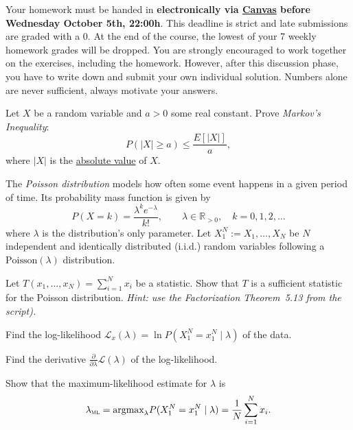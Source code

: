 \documentclass[a4paper,10pt,landscape,twocolumn]{scrartcl}
\newcommand\deadline{Wednesday October 5th, 22:00h}
\begin{document}
\homeworkproblems

{\sffamily\noindent
Your homework must be handed in \textbf{electronically via \href{\canvasURL}{Canvas} before \deadline}. 
 This deadline is strict and late submissions are graded with a 0. At the end of the course, the lowest of your 7 weekly homework grades will be dropped. You are strongly encouraged to work together on the exercises, including the homework. However, after this discussion phase, you have to write down and submit your own individual solution. Numbers alone are never sufficient, always motivate your answers.
}

\begin{exercise}
	Let $X$ be a random variable and $a > 0$ some real constant. Prove 
	\emph{Markov's Inequality}:
	\[
	P(|X| \ge a) \le \frac{E[|X|]}{a},
	\]
	where $|X|$ is the \href{https://en.wikipedia.org/wiki/Absolute_value}{absolute value} of $X$.
\end{exercise}


\begin{exercise}
	The \emph{Poisson distribution} models how often some event happens in a given period of time. Its probability mass function is given by
	\[
	P(X = k) = {\frac {\lambda ^{k}e^{-\lambda }}{k!}}, \qquad \lambda \in \mathbb{R}_{>0}, \quad k=0,1,2,\dots
	\]
	where $\lambda$ is the distribution's only parameter. 
	Let $X_1^N := X_1, \dots, X_N$ be $N$ independent and identically distributed (i.i.d.) random variables following a $\text{Poisson}(\lambda)$ distribution.
		
	\begin{subex}[1pt]
	Let $T(x_1, \dots, x_N) = \sum_{i=1}^N x_i$ be a
        statistic. Show that $T$ is a sufficient statistic for the
        Poisson distribution. \emph{Hint: use the Factorization
          Theorem~5.13 from the script).}
	\end{subex}

	\begin{subex}[1pt]
	Find the log-likelihood $\mathcal L_x(\lambda) = \ln P(X_1^N =
        x_1^N\mid \lambda)$ of the data.
	\end{subex}
	
	\begin{subex}[0.5pt]
		Find the derivative $\frac{\partial}{\partial \lambda} \mathcal L(\lambda)$ of the log-likelihood.
	\end{subex}
	
	\begin{subex}[1pt]
		Show that the maximum-likelihood estimate for $\lambda$ is
		\[
			\lambda_\textsc{ml} = \text{argmax}_\lambda
                        P(X_1^N = x_1^N \mid \lambda) = \frac{1}{N}\sum_{i=1}^N x_i.
		\]
	\end{subex}
	
\end{exercise}
\end{document}
